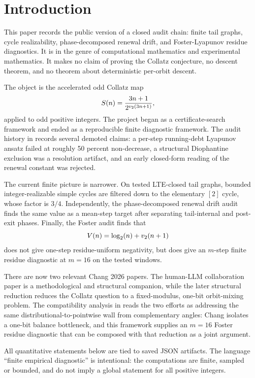 \section{Introduction}

This paper records the public version of a closed audit chain: finite tail
graphs, cycle realizability, phase-decomposed renewal drift, and
Foster-Lyapunov residue diagnostics.  It is in the genre of computational
mathematics and experimental mathematics.  It makes no claim of proving the
Collatz conjecture, no descent theorem, and no theorem about deterministic
per-orbit descent.

The object is the accelerated odd Collatz map
\[
  S(n)=\frac{3n+1}{2^{v_2(3n+1)}} ,
\]
applied to odd positive integers.  The project began as a certificate-search
framework and ended as a reproducible finite diagnostic framework.  The audit
history in  records several
demoted claims: a per-step running-debt Lyapunov ansatz failed at roughly
50 percent non-decrease, a structural Diophantine exclusion was a resolution
artifact, and an early closed-form reading of the renewal constant was rejected.

The current finite picture is narrower.  On tested LTE-closed tail graphs,
bounded integer-realizable simple cycles are filtered down to the elementary
\([2]\) cycle, whose factor is \(3/4\).  Independently, the phase-decomposed
renewal drift audit finds the same value as a mean-step target after separating
tail-internal and post-exit phases.  Finally, the Foster audit finds that
\[
  V(n)=\log_2(n)+v_2(n+1)
\]
does not give one-step residue-uniform negativity, but does give an \(m\)-step
finite residue diagnostic at \(m=16\) on the tested windows.

There are now two relevant Chang 2026 papers.  The human-LLM collaboration
paper \cite{chang2026collatz} is a methodological and structural companion,
while the later structural reduction \cite{chang2026reduction} reduces the
Collatz question to a fixed-modulus, one-bit orbit-mixing problem.  The
compatibility analysis in
reads the two efforts as addressing the same distributional-to-pointwise wall
from complementary angles: Chang isolates a one-bit balance bottleneck, and
this framework supplies an \(m=16\) Foster residue diagnostic that can be
composed with that reduction as a joint argument.

\begin{caveat}
All quantitative statements below are tied to saved JSON artifacts.  The
language ``finite empirical diagnostic'' is intentional: the computations are
finite, sampled or bounded, and do not imply a global statement for all
positive integers.
\end{caveat}
